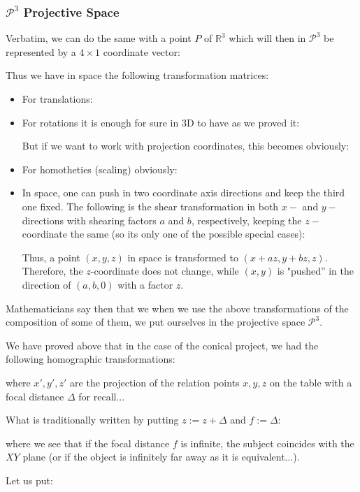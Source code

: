	\subsubsection{$\mathcal{P}^3$ Projective Space}
	Verbatim, we can do the same with a point $P$ of $\mathbb{R}^3$ which will then in $\mathcal{P}^3$ be represented by a $4\times 1$ coordinate vector:
	
	Thus we have in space the following transformation matrices:
	\begin{itemize}
		\item For translations:
		
		
		\item For rotations it is enough for sure in 3D to have as we proved it:
		
		But if we want to work with projection coordinates, this becomes obviously:
		
		
		\item For homotheties (scaling) obviously:
		
		
		\item In space, one can push in two coordinate axis directions and keep the third one fixed. The following is the shear transformation in both $x-$ and $y-$directions with shearing factors $a$ and $b$, respectively, keeping the $z-$ coordinate the same (so its only one of the possible special cases):
		
		Thus, a point $(x, y, z)$ in space is transformed to $(x + az, y + bz, z)$. Therefore, the $z$-coordinate does not change, while $(x, y)$ is "pushed'' in the direction of $(a, b, 0)$ with a factor $z$.
	\end{itemize}
	Mathematicians say then that we when we use the above transformations of the composition of some of them, we put ourselves in the projective space $\mathcal{P}^3$.
	
	We have proved above that in the case of the conical project, we had the following homographic transformations:
	
	where $x',y',z'$ are the projection of the relation points $x,y,z$ on the table with a focal distance $\Delta$ for recall...

	What is traditionally written by putting $z:=z+\Delta$ and $f:=\Delta$:
	
	where we see that if the focal distance $f$ is infinite, the subject coincides with the $XY$ plane (or if the object is infinitely far away as it is equivalent...).
	
	Let us put:
	
